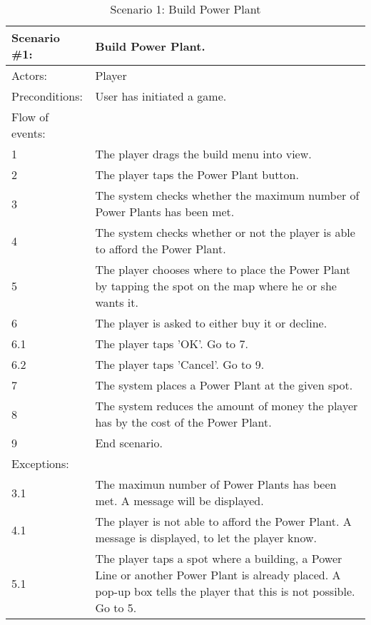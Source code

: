 \begin{table}[H]
	\begin{tabular}{| l | p{10cm} |}
		\hline
		\rowcolor{lightgray}
		{\bf Scenario \#1:} & {\bf Build Power Plant.} \\ \hline
		Actors: & Player \\ \hline
		Preconditions: & User has initiated a game. \\ \hline
		\rowcolor{lightergray}
		Flow of events: &  \\ \hline
		1 & The player drags the build menu into view. \\ \hline
		2 & The player taps the Power Plant button. \\ \hline
		3 & The system checks whether the maximum number of Power Plants has been met. \\ \hline
		4 & The system checks whether or not the player is able to afford the Power Plant. \\ \hline
		5 & The player chooses where to place the Power Plant by tapping the spot on the map where he or she wants it. \\ \hline
		6 & The player is asked to either buy it or decline. \\ \hline
		6.1 & The player taps 'OK'. Go to 7. \\ \hline
		6.2 & The player taps 'Cancel'. Go to 9. \\ \hline
		7 & The system places a Power Plant at the given spot. \\ \hline
		8 & The system reduces the amount of money the player has by the cost of the Power Plant. \\ \hline
		9 & End scenario. \\ \hline
		\rowcolor{lightergray}
		Exceptions: & \\ \hline
		3.1 & The maximun number of Power Plants has been met. A message will be displayed. \\ \hline
		4.1 & The player is not able to afford the Power Plant. A message is displayed, to let the player know. \\ \hline
		5.1 & The player taps a spot where a building, a Power Line or another Power Plant is already placed. A pop-up box tells the player that this is not possible. Go to 5. \\ \hline
	\end{tabular}
\caption{Scenario 1: Build Power Plant}
\end{table}

